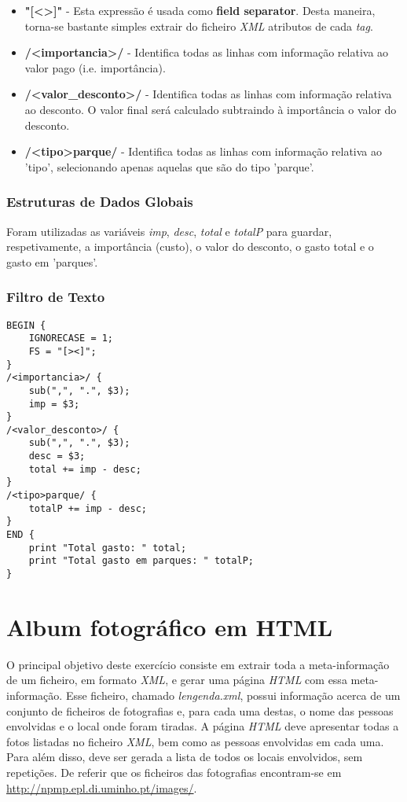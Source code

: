 \documentclass{article}
\begin{document}
\begin{itemize}
    \item \textbf{"[\textless\textgreater]"} - Esta expressão é usada como \textbf{field separator}. Desta maneira, torna-se bastante simples extrair do ficheiro \emph{XML} atributos de cada \emph{tag}.
    \item \textbf{/\textless importancia\textgreater/} - Identifica todas as linhas com informação relativa ao valor pago (i.e. importância).
    \item \textbf{/\textless valor\_desconto\textgreater/} - Identifica todas as linhas com informação relativa ao desconto. O valor final será calculado subtraindo à importância o valor do desconto.
    \item \textbf{/\textless tipo\textgreater parque/} - Identifica todas as linhas com informação relativa ao 'tipo', selecionando apenas aquelas que são do tipo 'parque'.
\end{itemize}

\subsubsection{Estruturas de Dados Globais}

Foram utilizadas as variáveis \emph{imp}, \emph{desc}, \emph{total} e \emph{totalP} para guardar, respetivamente, a importância (custo), o valor do desconto, o gasto total e o gasto em 'parques'.

\subsubsection{Filtro de Texto}

\begin{lstlisting}
BEGIN {
	IGNORECASE = 1;
	FS = "[><]";
}
/<importancia>/ {
	sub(",", ".", $3);
	imp = $3;
}
/<valor_desconto>/ {
	sub(",", ".", $3);
	desc = $3;
	total += imp - desc;
}
/<tipo>parque/ {
	totalP += imp - desc;
}
END {
	print "Total gasto: " total;
	print "Total gasto em parques: " totalP;
}
\end{lstlisting}



\vspace{15}
\section{Album fotográfico em HTML}

O principal objetivo deste exercício consiste em extrair toda a meta-informação de um ficheiro, em formato \emph{XML}, e gerar uma página \emph{HTML} com essa meta-informação. Esse ficheiro, chamado \emph{lengenda.xml}, possui informação acerca de um conjunto de ficheiros de fotografias e, para cada uma destas, o nome das pessoas envolvidas e o local onde foram tiradas. A página \emph{HTML} deve apresentar todas a fotos listadas no ficheiro \emph{XML}, bem como as pessoas envolvidas em cada uma. Para além disso, deve ser gerada a lista de todos os locais envolvidos, sem repetições. De referir que os ficheiros das fotografias encontram-se em \url{http://npmp.epl.di.uminho.pt/images/}.
\end{document}
